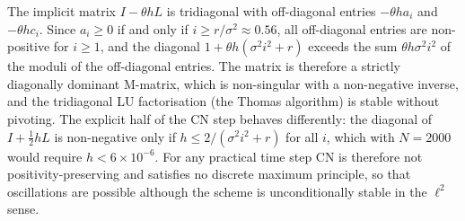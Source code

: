 \documentclass[11pt,a4paper]{article}
\begin{document}
The implicit matrix $I-\theta hL$ is tridiagonal with off-diagonal entries $-\theta h a_i$ and $-\theta h c_i$.
Since $a_i\ge0$ if and only if $i \ge r/\sigma^2 \approx 0.56$, all off-diagonal entries are non-positive for $i\ge1$, and the diagonal $1+\theta h(\sigma^2i^2+r)$ exceeds the sum $\theta h\sigma^2i^2$ of the moduli of the off-diagonal entries.
The matrix is therefore a strictly diagonally dominant M-matrix, which is non-singular with a non-negative inverse, and the tridiagonal LU factorisation (the Thomas algorithm) is stable without pivoting.
The explicit half of the CN step behaves differently: the diagonal of $I+\frac12hL$ is non-negative only if $h \le 2/(\sigma^2i^2+r)$ for all $i$, which with $N=2000$ would require $h<6\times10^{-6}$.
For any practical time step CN is therefore not positivity-preserving and satisfies no discrete maximum principle, so that oscillations are possible although the scheme is unconditionally stable in the $\ell^2$ sense.
\end{document}
